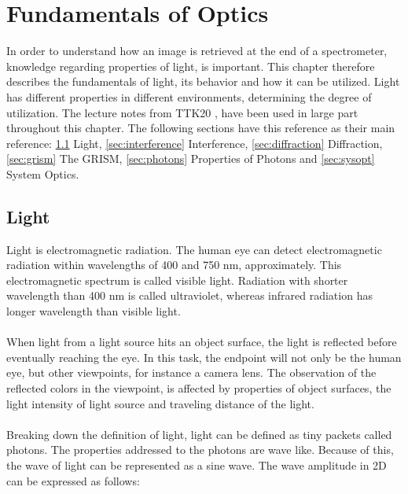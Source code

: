\chapter{Fundamentals of Optics}
\label{chap:theory1}

In order to understand how an image is retrieved at the end of a spectrometer, knowledge regarding properties of light, is important. This chapter therefore describes the fundamentals of light, its behavior and how it can be utilized. Light has different properties in different environments, determining the degree of utilization. The lecture notes from TTK20 \cite{sigernes2018}, have been used in large part throughout this chapter. The following sections have this reference as their main reference: \ref{sec:light} Light, \ref{sec:interference} Interference, \ref{sec:diffraction} Diffraction, \ref{sec:grism} The GRISM, \ref{sec:photons} Properties of Photons and \ref{sec:sysopt} System Optics. 

\section{Light} \label{sec:light}
Light is electromagnetic radiation. The human eye can detect electromagnetic radiation within wavelengths of 400 and 750 nm, approximately. This electromagnetic spectrum is called visible light. Radiation with shorter wavelength than 400 nm is called ultraviolet, whereas infrared radiation has longer wavelength than visible light.
\\\\
When light from a light source hits an object surface, the light is reflected before eventually reaching the eye. In this task, the endpoint will not only be the human eye, but other viewpoints, for instance a camera lens. The observation of the reflected colors in the viewpoint, is affected by properties of object surfaces, the light intensity of light source and traveling distance of the light. \cite{yamashita_fujii_kaneko_2007}
\\\\
Breaking down the definition of light, light can be defined as tiny packets called photons. The properties addressed to the photons are wave like. Because of this, the wave of light can be represented as a sine wave. The wave amplitude in 2D can be expressed as follows: 


